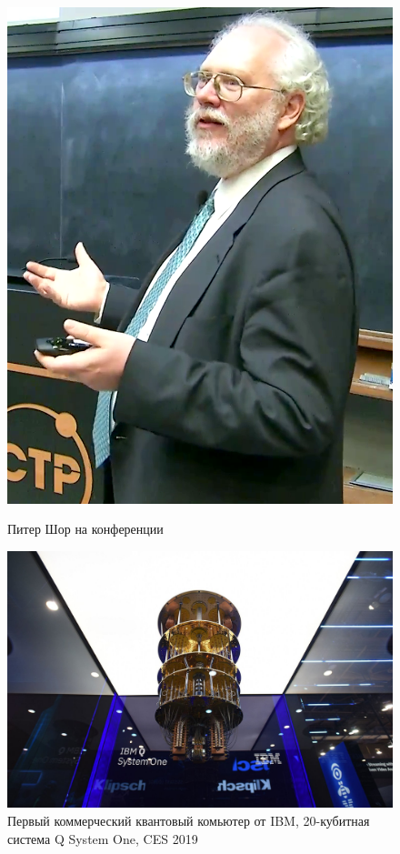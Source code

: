 \begin{figure}[h!]
    \begin{center}
    \begin{minipage}[h]{0.3\linewidth}
        \includegraphics[width=1\linewidth]{pics/Peter_Shor.png}
        \caption{Питер Шор на конференции} 
    \label{} 
    \end{minipage}
\hfill
    \begin{minipage}[h]{0.6\linewidth}
        \includegraphics[width=1\linewidth]{pics/IBM_quantum_computer.jpg}
        \caption{Первый коммерческий квантовый комьютер от IBM, 20-кубитная система Q System One, CES 2019}
        \label{}
    \end{minipage}
    \end{center}
\end{figure}

